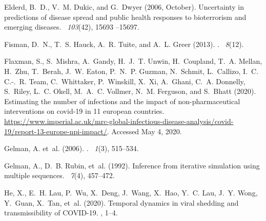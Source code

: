 \documentclass[12pt]{article}
\begin{document}
\begin{thebibliography}{}
Elderd, B.~D., V.~M. Dukic, and G.~Dwyer (2006, October).
\newblock Uncertainty in predictions of disease spread and public health
  responses to bioterrorism and emerging diseases.
~{\em 103\/}(42), 15693 --15697.

Fisman, D.~N., T.~S. Hauck, A.~R. Tuite, and A.~L. Greer (2013).
.
~{\em 8\/}(12).

Flaxman, S., S.~Mishra, A.~Gandy, H.~J.~T. Unwin, H.~Coupland, T.~A. Mellan,
  H.~Zhu, T.~Berah, J.~W. Eaton, P.~N.~P. Guzman, N.~Schmit, L.~Callizo, I.~C.
  C.-.~R. Team, C.~Whittaker, P.~Winskill, X.~Xi, A.~Ghani, C.~A. Donnelly,
  S.~Riley, L.~C. Okell, M.~A.~C. Vollmer, N.~M. Ferguson, and S.~Bhatt (2020).
\newblock Estimating the number of infections and the impact of
  non-pharmaceutical interventions on covid-19 in 11 european countries.
\newblock
  \url{https://www.imperial.ac.uk/mrc-global-infectious-disease-analysis/covid-19/report-13-europe-npi-impact/}.
  Accessed May 4, 2020.

Gelman, A. et~al. (2006).
.
~{\em 1\/}(3), 515--534.

Gelman, A., D.~B. Rubin, et~al. (1992).
\newblock Inference from iterative simulation using multiple sequences.
~{\em 7\/}(4), 457--472.

He, X., E.~H. Lau, P.~Wu, X.~Deng, J.~Wang, X.~Hao, Y.~C. Lau, J.~Y. Wong,
  Y.~Guan, X.~Tan, et~al. (2020).
\newblock Temporal dynamics in viral shedding and transmissibility of
  {COVID-19}.
, 1--4.


\end{thebibliography}
\end{document}
